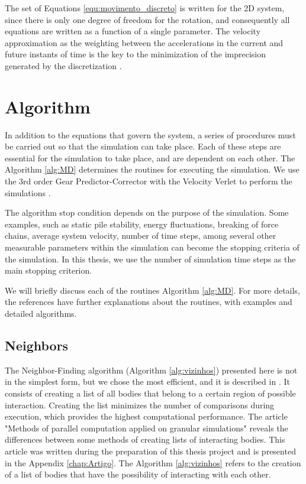     The set of Equations \ref{equ:movimento_discreto} is written for the 2D system, since there is only one degree of freedom for the rotation, and consequently all equations are written as a function of a single parameter. The velocity approximation as the weighting between the accelerations in the current and future instants of time is the key to the minimization of the imprecision generated by the discretization \cite{Computer_Simulation_of_Liquids}.

\section{Algorithm}
    In addition to the equations that govern the system, a series of procedures must be carried out so that the simulation can take place. Each of these steps are essential for the simulation to take place, and are dependent on each other. The Algorithm \ref{alg:MD} determines the routines for executing the simulation. We use the 3rd order Gear Predictor-Corrector with the Velocity Verlet to perform the simulations \cite{Computer_Simulation_of_Liquids}.



    The algorithm stop condition depends on the purpose of the simulation. Some examples, such as static pile stability, energy fluctuations, breaking of force chains, average system velocity, number of time steps, among several other measurable parameters within the simulation can become the stopping criteria of the simulation. In this thesis, we use the number of simulation time steps as the main stopping criterion. 

    We will briefly discuss each of the routines Algorithm \ref{alg:MD}. For more details, the references \cite{Dissertacao, Computer_Simulation_of_Liquids, Computational_Granular_Dynamics} have further explanations about the routines, with examples and detailed algorithms. 

\subsection{Neighbors}
    The Neighbor-Finding algorithm (Algorithm \ref{alg:vizinhos}) presented here is not in the simplest form, but we chose the most efficient, and it is described in \cite{Dissertacao}. It consists of creating a list of all bodies that belong to a certain region of possible interaction. Creating the list minimizes the number of comparisons during execution, which provides the highest computational performance. The article "Methods of parallel computation applied on granular simulations" \cite{Methods_of_Parallel_Computation_Applied_on_Granular_Simulations} reveals the differences between some methods of creating lists of interacting bodies. This article was written during the preparation of this thesis project and is presented in the Appendix \ref{chap:Artigo}. The Algorithm \ref{alg:vizinhos} refers to the creation of a list of bodies that have the possibility of interacting with each other.

